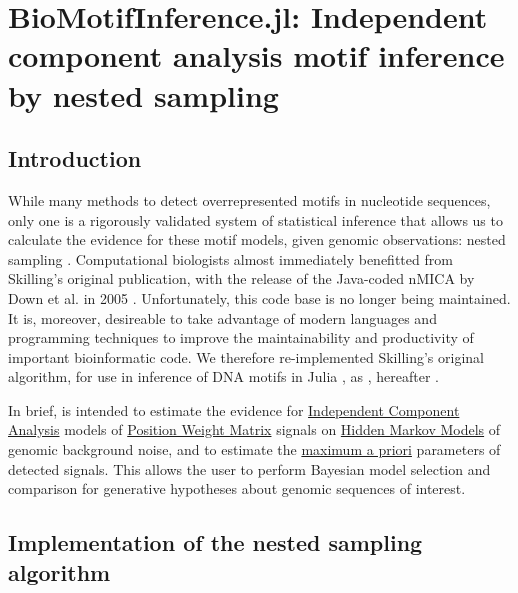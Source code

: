 \chapter{BioMotifInference.jl: Independent component analysis motif inference by nested sampling}
\label{chap:BMI}
\section{Introduction}
While many methods to detect overrepresented motifs in nucleotide sequences, only one is a rigorously validated system of statistical inference that allows us to calculate the evidence for these motif models, given genomic observations: nested sampling \cite{Skilling2006}. Computational biologists almost immediately benefitted from Skilling's original publication, with the release of the Java-coded nMICA by Down et al. in 2005 \cite{Down2005}. Unfortunately, this code base is no longer being maintained. It is, moreover, desireable to take advantage of modern languages and programming techniques to improve the maintainability and productivity of important bioinformatic code. We therefore re-implemented Skilling's original algorithm, for use in inference of DNA motifs in Julia \cite{Bezanson2015}, as , hereafter .

In brief,  is intended to estimate the evidence for \hyperref[ICA]{Independent Component Analysis} models of \hyperref[PWM]{Position Weight Matrix} signals on \hyperref[HMM]{Hidden Markov Models} of genomic background noise, and to estimate the \hyperref[MAP]{maximum a priori} parameters of detected signals. This allows the user to perform Bayesian model selection and comparison for generative hypotheses about genomic sequences of interest.

\section{Implementation of the nested sampling algorithm}


